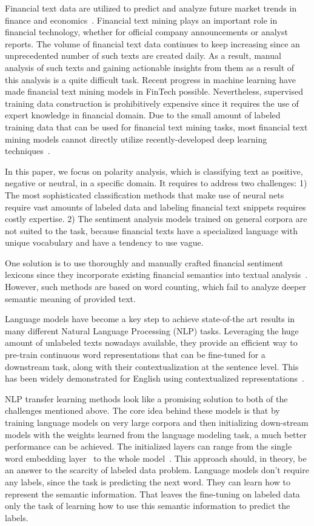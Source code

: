 \documentclass[11pt]{article}
\begin{document}
Financial text data are utilized to predict and analyze future market trends in finance and economics~\cite{xxx}. Financial text mining plays an important role in financial technology,
whether for official company announcements or analyst reports. The volume of financial text data continues to keep increasing since an unprecedented number of such texts are created daily.
As a result, manual analysis of such texts and gaining actionable insights from them as a result of this analysis is a quite difficult task.
Recent progress in machine learning have made financial text mining models in FinTech possible. Nevertheless, supervised training data construction is prohibitively expensive since it requires the
use of expert knowledge in financial domain. Due to the small amount of labeled training data that can be used for
financial text mining tasks, most financial text mining models cannot directly utilize recently-developed deep learning
techniques~\cite{xxx}.

In this paper, we focus on polarity analysis, which is classifying text as positive, negative or neutral,
in a specific domain. It requires to address two challenges: 1) The
most sophisticated classification methods that make use of neural
nets require vast amounts of labeled data and labeling financial
text snippets requires costly expertise. 2) The sentiment analysis
models trained on general corpora are not suited to the task, because
financial texts have a specialized language with unique vocabulary
and have a tendency to use vague.

One solution is to use thoroughly and manually crafted financial sentiment lexicons since they incorporate existing financial semantics into textual analysis~\cite{loughran2016}.
However, such methods are based on word counting, which 
fail to analyze deeper semantic meaning of provided text.

Language models have become a key step to achieve state-of-the art results in many different Natural Language Processing (NLP)
tasks. Leveraging the huge amount of unlabeled texts nowadays available, they provide an efficient way to pre-train continuous word
representations that can be fine-tuned for a downstream task, along with their contextualization at the sentence level. This has been
widely demonstrated for English using contextualized
representations~\cite{dai2015, peters2018, howard2018, radford2018,
  devlin2019, yang2019}.

NLP transfer learning methods look like a promising solution
to both of the challenges mentioned above. The core idea behind these models is that by training
language models on very large corpora and then initializing down-stream models with the weights learned from the language
modeling task, a much better performance can be achieved. The
initialized layers can range from the single word embedding layer~\cite{peters2018} to the whole model~\cite{howard2018}. This approach should, in theory, be an
answer to the scarcity of labeled data problem. Language models
don’t require any labels, since the task is predicting the next word.
They can learn how to represent the semantic information. That
leaves the fine-tuning on labeled data only the task of learning how
to use this semantic information to predict the labels.
\end{document}
